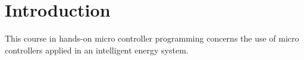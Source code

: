 \chapter{Introduction}
\label{chap:intro}
This course in hands-on micro controller programming concerns the use of micro controllers applied in an intelligent energy system.  

\def\nompreamble{

To create the list of symbols execute:

\texttt{makeindex <filenamee>.nlo -s nomencl.ist -o <filename>.nls}

\begin{tabular}{l l}\\
  \multicolumn{2}{l}{{\bf Abbreviations:}}\\
  TSO & Transmission System Operator \\
  ISO & Independent System Operator \\
  \ldots & 
\end{tabular}

{Upper-case notation of voltages and currents are phasors.
  Vectors and matrices are written in {\bf bold}.}
}
\printnomenclature

